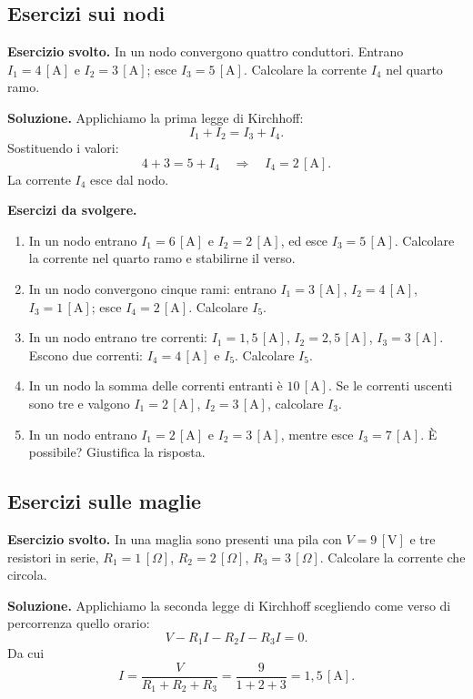 \subsection{Esercizi sui nodi}

\begin{esercizio}
\textbf{Esercizio svolto.} In un nodo convergono quattro conduttori. Entrano \(I_1 = 4\,[\text{A}]\) e \(I_2 = 3\,[\text{A}]\); esce \(I_3 = 5\,[\text{A}]\). Calcolare la corrente \(I_4\) nel quarto ramo.

\smallskip
\textbf{Soluzione.} Applichiamo la prima legge di Kirchhoff:
\[
I_1 + I_2 = I_3 + I_4.
\]
Sostituendo i valori:
\[
4 + 3 = 5 + I_4 \quad \Longrightarrow \quad I_4 = 2\,[\text{A}].
\]
La corrente \(I_4\) esce dal nodo.
\end{esercizio}

\textbf{Esercizi da svolgere.}

\begin{enumerate}[leftmargin=1cm]
  \item In un nodo entrano \(I_1 = 6\,[\text{A}]\) e \(I_2 = 2\,[\text{A}]\), ed esce \(I_3 = 5\,[\text{A}]\). Calcolare la corrente nel quarto ramo e stabilirne il verso.
  \item In un nodo convergono cinque rami: entrano \(I_1 = 3\,[\text{A}]\), \(I_2 = 4\,[\text{A}]\), \(I_3 = 1\,[\text{A}]\); esce \(I_4 = 2\,[\text{A}]\). Calcolare \(I_5\).
  \item In un nodo entrano tre correnti: \(I_1 = 1{,}5\,[\text{A}]\), \(I_2 = 2{,}5\,[\text{A}]\), \(I_3 = 3\,[\text{A}]\). Escono due correnti: \(I_4 = 4\,[\text{A}]\) e \(I_5\). Calcolare \(I_5\).
  \item In un nodo la somma delle correnti entranti è \(10\,[\text{A}]\). Se le correnti uscenti sono tre e valgono \(I_1 = 2\,[\text{A}]\), \(I_2 = 3\,[\text{A}]\), calcolare \(I_3\).
  \item In un nodo entrano \(I_1 = 2\,[\text{A}]\) e \(I_2 = 3\,[\text{A}]\), mentre esce \(I_3 = 7\,[\text{A}]\). È possibile? Giustifica la risposta.
\end{enumerate}

\subsection{Esercizi sulle maglie}

\begin{esercizio}
\textbf{Esercizio svolto.} In una maglia sono presenti una pila con \(V = 9\,[\text{V}]\) e tre resistori in serie, \(R_1 = 1\,[\Omega]\), \(R_2 = 2\,[\Omega]\), \(R_3 = 3\,[\Omega]\). Calcolare la corrente che circola.

\smallskip
\textbf{Soluzione.} Applichiamo la seconda legge di Kirchhoff scegliendo come verso di percorrenza quello orario:
\[
V - R_1 I - R_2 I - R_3 I = 0.
\]
Da cui
\[
I = \frac{V}{R_1 + R_2 + R_3} = \frac{9}{1 + 2 + 3} = 1{,}5\,[\text{A}].
\]
\end{esercizio}


